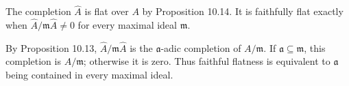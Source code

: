 The completion $\widehat A$ is flat over $A$ by Proposition 10.14. It is faithfully flat exactly when $\widehat A/\mathfrak{m}\widehat A\ne0$ for every maximal ideal $\mathfrak{m}$.

By Proposition 10.13, $\widehat A/\mathfrak{m}\widehat A$ is the $\mathfrak{a}$-adic completion of $A/\mathfrak{m}$. If $\mathfrak{a}\subseteq\mathfrak{m}$, this completion is $A/\mathfrak{m}$; otherwise it is zero. Thus faithful flatness is equivalent to $\mathfrak{a}$ being contained in every maximal ideal.
